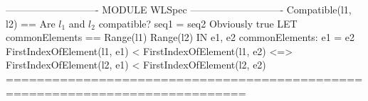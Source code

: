 \documentclass{article}
\begin{document}
\begin{tla}
---------------------------- MODULE WLSpec ----------------------------
Compatible(l1, l2) == \* Are $l_1$ and $l_2$ compatible?
    \/ seq1 = seq2 \* Obviously true
    \/ LET commonElements == Range(l1) \cap Range(l2)
       IN \A e1, e2 \in commonElements:
            \/ e1 = e2
            \/ FirstIndexOfElement(l1, e1) < FirstIndexOfElement(l1, e2) 
               <=> FirstIndexOfElement(l2, e1) < FirstIndexOfElement(l2, e2)
=============================================================================
\end{tla}
\end{document}
